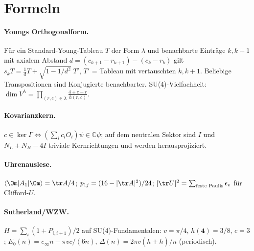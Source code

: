 \section{Formeln}
\paragraph{Youngs Orthogonalform.} Für ein Standard-Young-Tableau $T$ der Form $\lambda$ und benachbarte Einträge $k,k{+}1$ mit axialem Abstand $d=(c_{k+1}-r_{k+1})-(c_k-r_k)$ gilt $s_kT=\frac1dT+\sqrt{1-1/d^2}\;T'$, $T'$ = Tableau mit vertauschten $k,k{+}1$. Beliebige Transpositionen sind Konjugierte benachbarter. SU(4)-Vielfachheit: $\dim V^\lambda=\prod_{(r,c)\in\lambda}\frac{4+c-r}{h(r,c)}$.
\paragraph{Kovarianzkern.} $c\in\ker\Gamma\iff(\sum_ic_iO_i)\psi\in\mathbb C\psi$; auf dem neutralen Sektor sind $I$ und $N_L+N_H-4I$ triviale Kernrichtungen und werden herausprojiziert.
\paragraph{Uhrenauslese.} $\langle\Om|A_1|\Om\rangle=\tr A/4$; $p_{1j}=(16-|\tr A|^2)/24$; $|\tr U|^2=\sum_{\text{feste Paulis}}\epsilon_v$ für Clifford-$U$.
\paragraph{Sutherland/WZW.} $H=\sum_i(1+P_{i,i+1})/2$ auf SU(4)-Fundamentalen: $v=\pi/4$, $h(\mathbf 4)=3/8$, $c=3$; $E_0(n)=e_\infty n-\pi vc/(6n)$, $\Delta(n)=2\pi v(h+\bar h)/n$ (periodisch).


